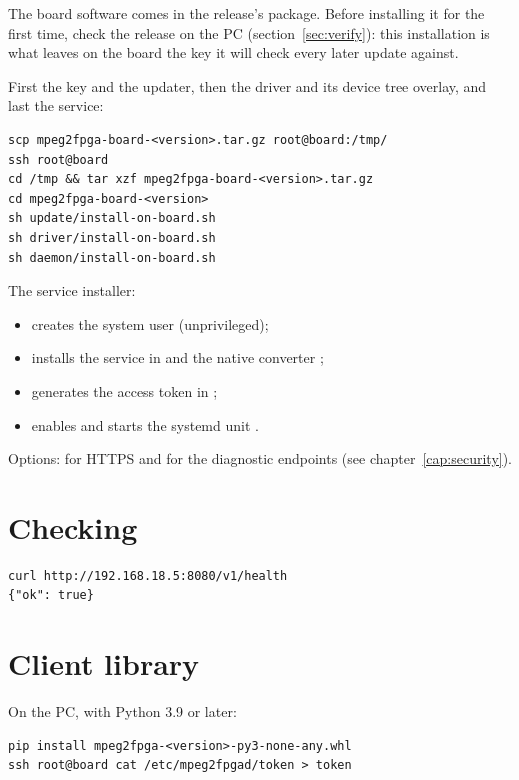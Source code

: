The board software comes in the release's
 package. Before installing it for the
first time, check the release on the PC (section~\ref{sec:verify}): this
installation is what leaves on the board the key it will check every later
update against.

First the key and the updater, then the driver and its device tree overlay,
and last the service:

\begin{lstlisting}[language=shell]
scp mpeg2fpga-board-<version>.tar.gz root@board:/tmp/
ssh root@board
cd /tmp && tar xzf mpeg2fpga-board-<version>.tar.gz
cd mpeg2fpga-board-<version>
sh update/install-on-board.sh
sh driver/install-on-board.sh
sh daemon/install-on-board.sh
\end{lstlisting}

The service installer:
\begin{itemize}
  \item creates the  system user (unprivileged);
  \item installs the service in  and the native
    converter ;
  \item generates the access token in ;
  \item enables and starts the systemd unit .
\end{itemize}

Options:  for HTTPS and  for the diagnostic
endpoints (see chapter~\ref{cap:security}).

\section{Checking}

\begin{lstlisting}[language=shell]
curl http://192.168.18.5:8080/v1/health
{"ok": true}
\end{lstlisting}

\section{Client library}

On the PC, with Python 3.9 or later:

\begin{lstlisting}[language=shell]
pip install mpeg2fpga-<version>-py3-none-any.whl
ssh root@board cat /etc/mpeg2fpgad/token > token
\end{lstlisting}

